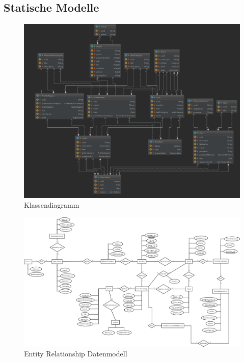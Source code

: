 		\subsection{Statische Modelle}
		\begin{figure}[H]
			\centering 
			\includegraphics[width=14cm]{img/klassendiagramm.png}
			\captionsetup{format=hang}
			\caption[Klassendiagramm]{\label{fig:klassendiagramm} Klassendiagramm }
		\end{figure}
		
		\begin{figure}[H]
			\centering 
			\includegraphics[width=15cm]{img/erModell.png}
			\captionsetup{format=hang}
			\caption[Entity Relationship Datenmodell]{\label{fig:erModell} Entity Relationship Datenmodell}
		\end{figure}
		
